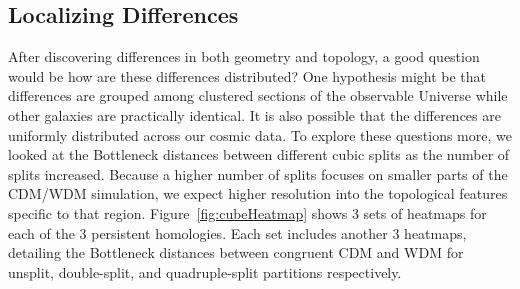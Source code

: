 \documentclass[12pt]{article}
\newcommand{\figref}[1]{Figure~\ref{#1}}
\begin{document}
\subsection{Localizing Differences}
After discovering differences in both geometry and topology, a good question would be how are these differences distributed? One hypothesis might be that differences are grouped among clustered sections of the observable Universe while other galaxies are practically identical. It is also possible that the differences are uniformly distributed across our cosmic data. To explore these questions more, we looked at the Bottleneck distances between different cubic splits as the number of splits increased. Because a higher number of splits focuses on smaller parts of the CDM/WDM simulation, we expect higher resolution into the topological features specific to that region. \figref{fig:cubeHeatmap} shows 3 sets of heatmaps for each of the 3 persistent homologies. Each set includes another 3 heatmaps, detailing the Bottleneck distances between congruent CDM and WDM for unsplit, double-split, and quadruple-split partitions respectively.
\end{document}
